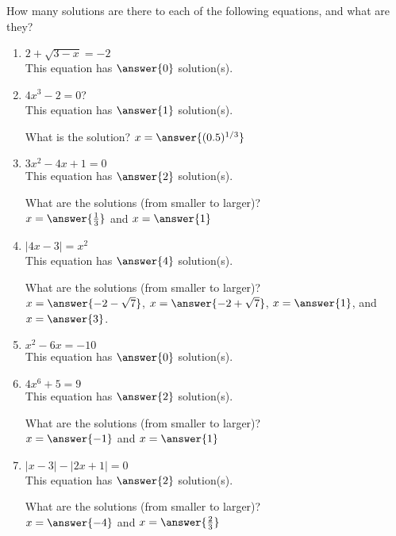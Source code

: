 \documentclass{ximera}
\author{Elizabeth Campolongo}
\begin{document}
\begin{exercise}
How many solutions are there to each of the following equations, and what are they?
\begin{enumerate}
\item $2+\sqrt{3-x}=-2$ \\
This equation has $\answer{0}$ solution(s).
%
\item $4x^3-2=0$? \\
This equation has $\answer{1}$ solution(s).
%
\begin{exercise}
What is the solution?
$x=\answer{(0.5)^{1/3}}$
\end{exercise}

\item $3x^2-4x+1=0$ \\
This equation has $\answer{2}$ solution(s).
\begin{exercise}
What are the solutions (from smaller to larger)?\\
$x=\answer{\frac{1}{3}}$ and $x=\answer{1}$
\end{exercise}

\item $|4x-3|=x^2$ \\
This equation has $\answer{4}$ solution(s).
\begin{exercise}
What are the solutions (from smaller to larger)?\\
$x = \answer{-2-\sqrt{7}}$, $x=\answer{-2+\sqrt{7}}$, $x=\answer{1}$, and $x = \answer{3}$. 
\end{exercise}

\item $x^2-6x=-10$ \\
This equation has $\answer{0}$ solution(s).


\item $4x^6+5=9$ \\
This equation has $\answer{2}$ solution(s).
\begin{exercise}
What are the solutions (from smaller to larger)?\\
$x=\answer{-1}$ and $x=\answer{1}$
\end{exercise}

\item $|x-3|-|2x+1|=0$ \\
This equation has $\answer{2}$ solution(s).
\begin{exercise}
What are the solutions (from smaller to larger)?\\
$x=\answer{-4}$ and $x=\answer{\frac{2}{3}}$
\end{exercise}


\end{enumerate}
\end{exercise}
\end{document}
